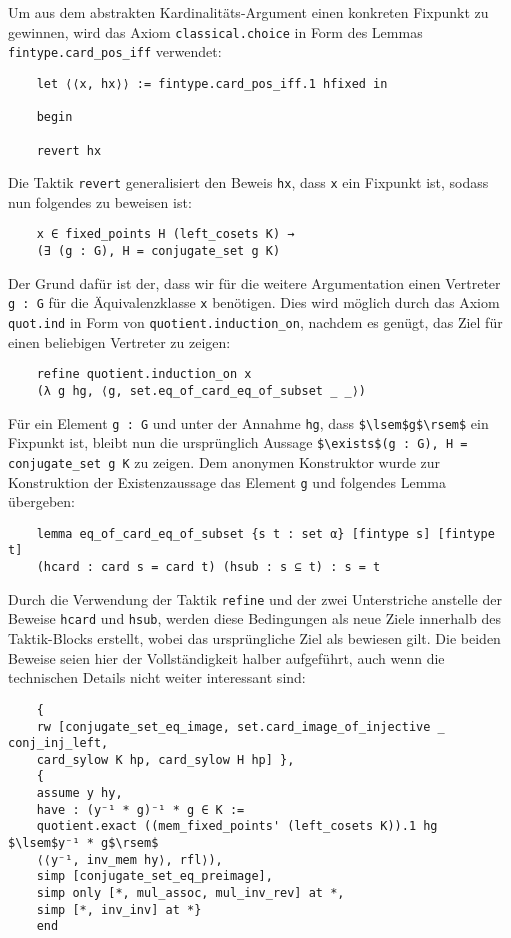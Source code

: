 \documentclass[a4paper,12pt]{scrartcl}
\newcommand{\ls}[1]{\lstinline|#1|}
\begin{document}
	Um aus dem abstrakten Kardinalitäts-Argument einen konkreten Fixpunkt zu gewinnen, wird das Axiom \ls{classical.choice} in Form des Lemmas \ls{fintype.card_pos_iff} verwendet:
	\begin{lstlisting}
	let ⟨⟨x, hx⟩⟩ := fintype.card_pos_iff.1 hfixed in
	
	begin
	
	revert hx
	\end{lstlisting}
	Die Taktik \ls{revert} generalisiert den Beweis \ls{hx}, dass \ls{x} ein Fixpunkt ist, sodass nun folgendes zu beweisen ist:
	\begin{lstlisting}
	x ∈ fixed_points H (left_cosets K) → 
	(∃ (g : G), H = conjugate_set g K)
	\end{lstlisting}
	Der Grund dafür ist der, dass wir für die weitere Argumentation einen Vertreter \ls{g : G} für die Äquivalenzklasse \ls{x} benötigen. Dies wird möglich durch das Axiom \ls{quot.ind} in Form von \ls{quotient.induction_on}, nachdem es genügt, das Ziel für einen beliebigen Vertreter zu zeigen:
	\begin{lstlisting}
	refine quotient.induction_on x
	(λ g hg, ⟨g, set.eq_of_card_eq_of_subset _ _⟩)
	\end{lstlisting}
	Für ein Element \ls{g : G} und unter der Annahme \ls{hg}, dass \ls{$\lsem$g$\rsem$} ein Fixpunkt ist, bleibt nun die ursprünglich Aussage \ls{$\exists$(g : G), H = conjugate_set g K} zu zeigen.
	Dem anonymen Konstruktor wurde zur Konstruktion der Existenzaussage das Element \ls{g} und folgendes Lemma übergeben:
	\begin{lstlisting}
	lemma eq_of_card_eq_of_subset {s t : set α} [fintype s] [fintype t]
	(hcard : card s = card t) (hsub : s ⊆ t) : s = t
	\end{lstlisting}
	Durch die Verwendung der Taktik \ls{refine} und der zwei Unterstriche anstelle der Beweise \ls{hcard} und \ls{hsub}, werden diese Bedingungen als neue Ziele innerhalb des Taktik-Blocks erstellt, wobei das ursprüngliche Ziel als bewiesen gilt. Die beiden Beweise seien hier der Vollständigkeit halber aufgeführt, auch wenn die technischen Details nicht weiter interessant sind:
	\begin{lstlisting}
	{ 
	rw [conjugate_set_eq_image, set.card_image_of_injective _ conj_inj_left,
	card_sylow K hp, card_sylow H hp] },
	{
	assume y hy,
	have : (y⁻¹ * g)⁻¹ * g ∈ K := 
	quotient.exact ((mem_fixed_points' (left_cosets K)).1 hg $\lsem$y⁻¹ * g$\rsem$ 
	⟨⟨y⁻¹, inv_mem hy⟩, rfl⟩),
	simp [conjugate_set_eq_preimage], 
	simp only [*, mul_assoc, mul_inv_rev] at *,
	simp [*, inv_inv] at *}
	end
	\end{lstlisting}
\newpage
\end{document}
